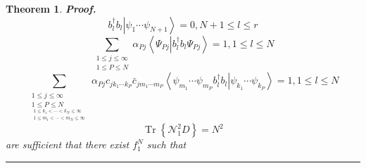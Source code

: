 \documentclass[aps,preprint]{revtex4}%
\newtheorem{theorem}{Theorem}
\newenvironment{proof}[1][Proof]{\noindent\textbf{#1.} }{\ \rule{0.5em}{0.5em}}
\begin{document}
\begin{theorem}
\begin{proof}
\begin{equation}
b_{l}^{\dagger}b_{l}\left\vert \psi_{1}\cdots\psi_{N+1}\right\rangle
=0,N+1\leq l\leq r
\end{equation}%
\begin{equation}
\sum_{\substack{1\leq j\leq\infty\\1\leq P\leq N}}\alpha_{Pj}\left\langle
\Psi_{Pj}\left\vert b_{l}^{\dagger}b_{l}\right.  \Psi_{Pj}\right\rangle
=1,1\leq l\leq N
\end{equation}%
\begin{equation}
\sum_{\substack{1\leq j\leq\infty\\1\leq P\leq N\\_{\substack{1\leq
k_{1}<\cdots<k_{N}\leq\infty\\1\leq m_{1}<\cdots<m_{N}\leq\infty}}}%
}\alpha_{Pj}c_{jk_{1}\cdots k_{P}}\bar{c}_{jm_{1}\cdots m_{P}}\left\langle
\psi_{m_{1}}\cdots\psi_{m_{P}}b_{l}^{\dagger}b_{l}\left\vert \psi_{k_{1}%
}\cdots\psi_{k_{P}}\right.  \right\rangle =1,1\leq l\leq N
\end{equation}%
\begin{equation}
\operatorname*{Tr}\left\{  \mathcal{N}_{1}^{2}D\right\}  =N^{2}%
\end{equation}
are sufficient that there exist $f_{1}^{N}$ such that
\end{proof}
\end{theorem}
\end{document}
